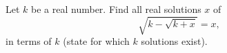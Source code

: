 Let $k$ be a real number. Find all real solutions $x$ of
\[
\sqrt{k-\sqrt{k+x}}=x ,
\]
in terms of $k$ (state for which $k$ solutions exist).
